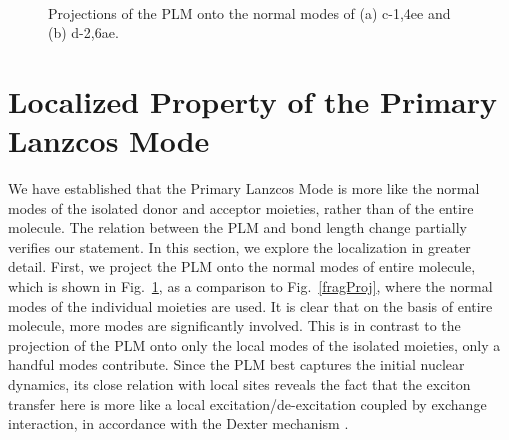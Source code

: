 \begin{figure}[!h]
\\
\caption{Projections of the PLM onto the normal modes of (a) c-1,4ee and (b) d-2,6ae.\label{LancProj}}
\end{figure}



\section{Localized Property of the Primary Lanzcos Mode}

We have established  that the Primary Lanzcos Mode is more like the normal modes of the isolated
donor and acceptor moieties, rather than of the entire molecule. The relation between the
PLM and bond length change partially verifies our statement.
In this section, we explore  the localization in greater detail.
First, we project the PLM onto the normal modes of entire molecule,
which is shown in Fig.~\ref{LancProj}, as a comparison to Fig.~\ref{fragProj}, where the normal modes of the individual moieties are used.    It is clear that on the basis of entire molecule, more modes are significantly involved.   This is in contrast to the projection of the PLM onto only the local modes of the isolated moieties, only a handful modes contribute.  Since the PLM  best captures the initial nuclear dynamics,
 its close relation with local sites reveals the fact that the exciton transfer here is more like a local excitation/de-excitation
coupled by exchange interaction,  in accordance with the Dexter mechanism \cite{dexter1953theory}.

